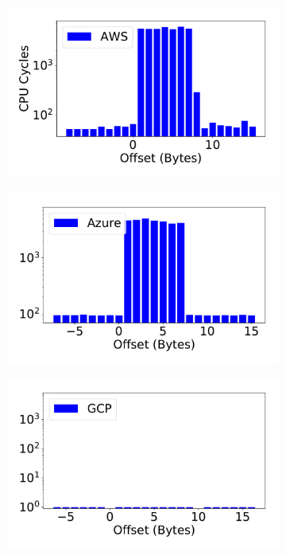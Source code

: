 \begin{figure}[h!]
\begin{subfigure}{.33\textwidth}
  \centering
  \includegraphics[width=.99\linewidth]{fig/membus_aws.pdf}
\end{subfigure}%
\begin{subfigure}{.33\textwidth}
  \centering
  \includegraphics[width=.99\linewidth]{fig/membus_azure.pdf}
\end{subfigure}
\begin{subfigure}{.33\textwidth}
  \centering
  \includegraphics[width=.99\linewidth]{fig/membus_gcp.pdf}

\end{subfigure}
\end{figure}
